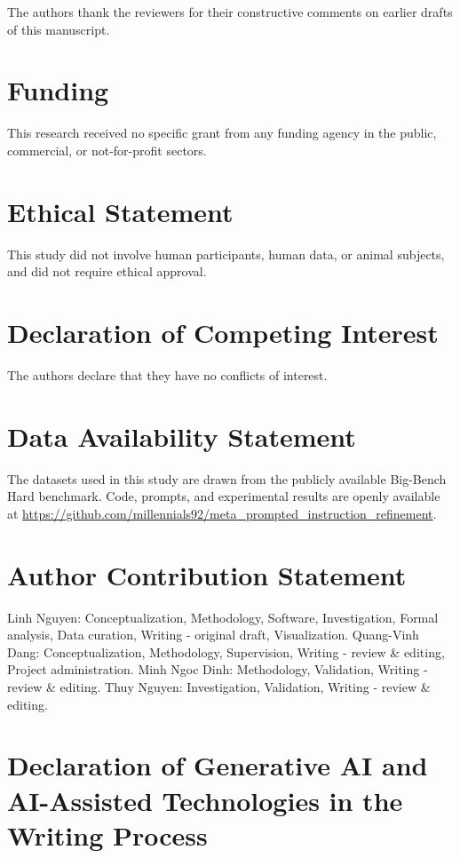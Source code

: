 \documentclass[a4paper,fleqn]{cas-sc}
\begin{document}
The authors thank the reviewers for their constructive comments on earlier drafts of this manuscript.

\section{Funding}

This research received no specific grant from any funding agency in the public, commercial, or not-for-profit sectors.

\section{Ethical Statement}

This study did not involve human participants, human data, or animal subjects, and did not require ethical approval.

\section{Declaration of Competing Interest}

The authors declare that they have no conflicts of interest.

\section{Data Availability Statement}

The datasets used in this study are drawn from the publicly available Big-Bench Hard benchmark. Code, prompts, and experimental results are openly available at \url{https://github.com/millennials92/meta_prompted_instruction_refinement}.

\section{Author Contribution Statement}

Linh Nguyen: Conceptualization, Methodology, Software, Investigation, Formal analysis, Data curation, Writing - original draft, Visualization. Quang-Vinh Dang: Conceptualization, Methodology, Supervision, Writing - review \& editing, Project administration. Minh Ngoc Dinh: Methodology, Validation, Writing - review \& editing. Thuy Nguyen: Investigation, Validation, Writing - review \& editing.

\section{Declaration of Generative AI and AI-Assisted Technologies in the Writing Process}
\end{document}
